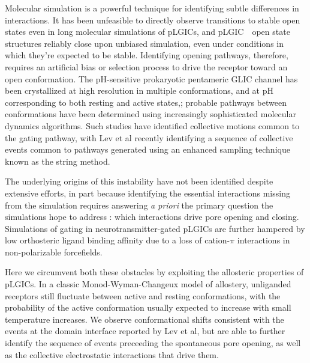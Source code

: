 \documentclass[journal=jacsat,manuscript=article]{achemso}
\newcommand{\GABAA}{GABA\textsubscript{A}R\xspace}
\newcommand{\plgic}{pLGIC~}
\begin{document}
Molecular simulation is a powerful technique for identifying subtle differences in interactions.  It has been unfeasible to directly observe transitions to stable open states even in long molecular simulations of pLGICs, and %
\plgic~open state structures reliably close upon unbiased simulation, even under conditions in which they're expected to be stable. \cite{Brannigan2008, Willenbring2011,LeBard2012,Yoluk2013} Identifying opening pathways, therefore, requires an artificial bias or selection process to drive the receptor toward an open conformation.
The pH-sensitive prokaryotic pentameric GLIC channel has been crystallized at high resolution in multiple conformations, and at pH corresponding to both resting and active states,\cite{Bocquet2009, Gonzalez-Gutierrez2013,Sauguet2014};  probable pathways between conformations have been determined using increasingly sophisticated molecular dynamics algorithms.\cite{Nury2010,Zhu2010,Calimet2013,Lev2017} Such studies have identified collective motions common to the gating pathway, with Lev et al\cite{Lev2017} recently identifying a sequence of collective events common to pathways generated using an enhanced sampling technique known as the string method.    

The underlying origins of this instability have not been identified despite extensive efforts, in part because identifying the essential interactions missing from the simulation requires answering {\it a priori} the primary question the simulations hope to address : which interactions drive pore opening and closing. Simulations of gating in neurotransmitter-gated pLGICs are further hampered by low orthosteric ligand binding affinity due to a loss of cation-$\pi$ interactions in non-polarizable forcefields.

Here we circumvent both these obstacles by exploiting the allosteric properties of pLGICs. In a classic Monod-Wyman-Changeux\cite{Changeux2011,Changeux2016} model of allostery, unliganded receptors still fluctuate between active and resting conformations, with the probability of the active conformation usually expected to increase with small temperature increases. %
We observe conformational shifts consistent with the events at the domain interface reported by Lev et al\cite{Lev2017}, but are able to further identify the sequence of events preceeding the spontaneous pore opening, as well as the collective electrostatic interactions that drive them.  
\end{document}

